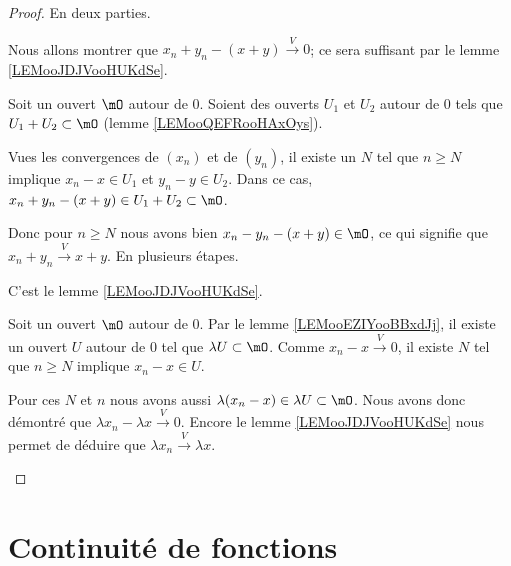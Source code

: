 \begin{proof}
	En deux parties.
	\begin{subproof}
		\spitem[\ref{ITEMooSHPAooQyEkgT}]
		Nous allons montrer que \( x_n+y_n-(x+y)\stackrel{V}{\longrightarrow}0\); ce sera suffisant par le lemme \ref{LEMooJDJVooHUKdSe}.

		Soit un ouvert \( \mO\) autour de \( 0\). Soient des ouverts \( U_1\) et \( U_2\) autour de \( 0\) tels que \( U_1+U_2\subset \mO\) (lemme \ref{LEMooQEFRooHAxOys}).

		Vues les convergences de \( (x_n)\) et de \( (y_n)\), il existe un \( N\) tel que \( n\geq N\) implique \( x_n-x\in U_1\) et \( y_n-y\in U_2\). Dans ce cas, \( x_n+y_n-(x+y)\in U_1+U_2\subset \mO\).

		Donc pour \( n\geq N\) nous avons bien \( x_n-y_n-(x+y)\in \mO\), ce qui signifie que \( x_n+y_n\stackrel{V}{\longrightarrow}x+y\).
		\spitem[\ref{ITEMooYHHYooYATzWE}]
		En plusieurs étapes.
		\begin{subproof}
			C'est le lemme \ref{LEMooJDJVooHUKdSe}.

			Soit un ouvert \( \mO\) autour de \( 0\). Par le lemme \ref{LEMooEZIYooBBxdJj}, il existe un ouvert \( U\) autour de \( 0\) tel que \( \lambda U\subset \mO\). Comme \( x_n-x\stackrel{V}{\longrightarrow}0\), il existe \( N\) tel que \( n\geq N\) implique \( x_n-x\in U\).

			Pour ces \( N\) et \( n\) nous avons aussi \( \lambda (x_n-x)\in \lambda U\subset \mO\). Nous avons donc démontré que \( \lambda x_n-\lambda x\stackrel{V}{\longrightarrow}0\).
			\spitem[Conclusion]
			Encore le lemme \ref{LEMooJDJVooHUKdSe} nous permet de déduire que \( \lambda x_n\stackrel{V}{\longrightarrow}\lambda x\).
		\end{subproof}
	\end{subproof}
\end{proof}

\section{Continuité de fonctions}

